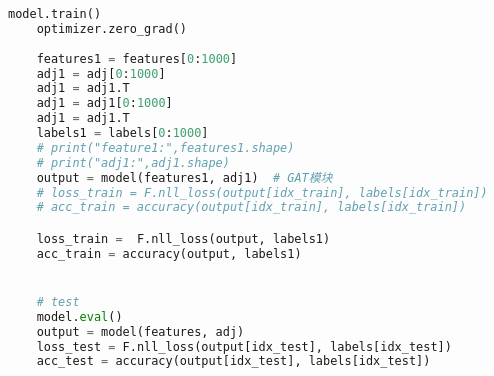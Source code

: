 \documentclass[a4paper]{article}
\begin{document}
\begin{lstlisting}[language=Python, caption=train \& test]
    model.train()
    optimizer.zero_grad()
    
    features1 = features[0:1000]
    adj1 = adj[0:1000]
    adj1 = adj1.T
    adj1 = adj1[0:1000]
    adj1 = adj1.T
    labels1 = labels[0:1000]
    # print("feature1:",features1.shape)
    # print("adj1:",adj1.shape)
    output = model(features1, adj1)  # GAT模块
    # loss_train = F.nll_loss(output[idx_train], labels[idx_train])
    # acc_train = accuracy(output[idx_train], labels[idx_train])

    loss_train =  F.nll_loss(output, labels1)
    acc_train = accuracy(output, labels1)


    # test
    model.eval()
    output = model(features, adj)
    loss_test = F.nll_loss(output[idx_test], labels[idx_test])
    acc_test = accuracy(output[idx_test], labels[idx_test])
\end{lstlisting}
\end{document}
